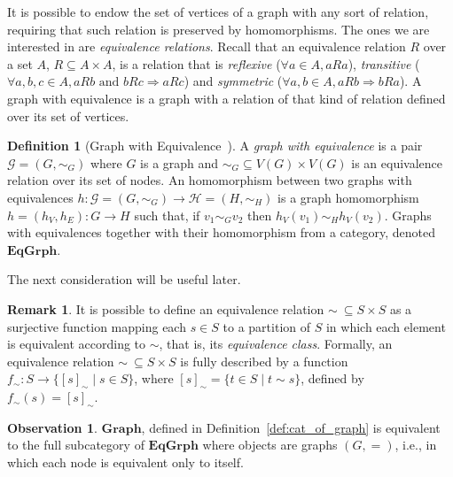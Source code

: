 \documentclass[a4paper, twoside,openright]{report}
\theoremstyle{plain}
\theoremstyle{definition}
\newtheorem{definition}[theorem]{Definition}
\newtheorem{remark}[theorem]{Remark}
\newtheorem{obs}[theorem]{Observation}
\begin{document}
It is possible to endow the set of vertices of a graph with any sort of relation, requiring that such relation is preserved by homomorphisms. The ones we are interested in are \emph{equivalence relations}. Recall that an equivalence relation $R$ over a set $A$, $R \subseteq A\times A$, is a relation that is \emph{reflexive} ($\forall a \in A, aRa$), \emph{transitive} ($\forall a, b, c \in A, aRb \text{ and } bRc \Rightarrow aRc$) and \emph{symmetric} ($\forall a, b \in A, aRb \Rightarrow bRa$). A graph with equivalence is a graph with a relation of that kind of relation defined over its set of vertices.

\begin{definition}[Graph with Equivalence~\cite{concur2006}]
    A \emph{graph with equivalence} is a pair $\mathcal{G} = (G, \sim_G)$ where $G$ is a graph and $\sim_G \subseteq V(G)\times V(G)$ is an equivalence relation over its set of nodes. An homomorphism between two graphs with equivalences $h :\mathcal{G} = (G, \sim_G)\rightarrow \mathcal{H} = (H, \sim_H)$ is a graph homomorphism $h = (h_V, h_E):G \rightarrow H$ such that, if $v_1 \sim_G v_2$ then $h_V(v_1) \sim_H h_V(v_2)$. Graphs with equivalences together with their homomorphism from a category, denoted $\mathbf{EqGrph}$.
\end{definition}

The next consideration will be useful later.

\begin{remark}
    It is possible to define an equivalence relation $\sim \ \subseteq S\times S$ as a surjective function mapping each $s \in S$ to a partition of $S$ in which each element is equivalent according to $\sim$, that is, its \emph{equivalence class}. Formally, an equivalence relation $\sim \ \subseteq S\times S$ is fully described by a function $f_\sim : S \rightarrow \{[s]_\sim \mid s \in S \}$, where $[s]_\sim = \{t \in S \mid t \sim s\}$, defined by $f_{\sim}(s) = [s]_\sim$. 
\end{remark}

\begin{obs}
    $\mathbf{Graph}$, defined in Definition~\ref{def:cat_of_graph} is equivalent to the full subcategory of $\mathbf{EqGrph}$ where objects are graphs $(G, =)$, i.e., in which each node is equivalent only to itself.
\end{obs}

\end{document}
